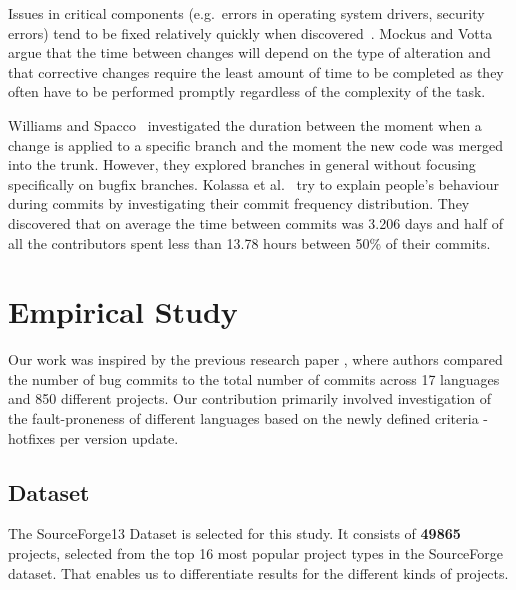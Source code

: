 \documentclass{sig-alternate}
\begin{document}
Issues in critical components (e.g.~errors in operating system drivers, security errors) tend to be fixed relatively quickly when discovered~\cite{Livshits2005}. Mockus and Votta~\cite{Mockus2000} argue that the time between changes will depend on the type of alteration and that corrective changes require the least amount of time to be completed as they often have to be performed promptly regardless of the complexity of the task.

Williams and Spacco~\cite{Williams2008} investigated the duration between the moment when a change is applied to a specific branch and the moment the new code was merged into the trunk. However, they explored branches in general without focusing specifically on bugfix branches. Kolassa et al.~\cite{Kolassa2013} try to explain people's behaviour during commits by investigating their commit frequency distribution. They discovered that on average the time between commits was 3.206 days and half of all the contributors spent less than 13.78 hours between 50\% of their commits.



\section{Empirical Study}


Our work was inspired by the previous research paper \cite{Ray2014}, where authors compared the number of bug commits to the total number of commits across 17 languages and 850 different projects. Our contribution primarily involved investigation of the fault-proneness of different languages based on the newly defined criteria - hotfixes per version update. 

\subsection{Dataset}
The SourceForge13 Dataset is selected for this study. It consists of \textbf{49865} projects, selected from the top 16 most popular project types in the SourceForge dataset. That enables us to differentiate results for the different kinds of projects.
\end{document}
